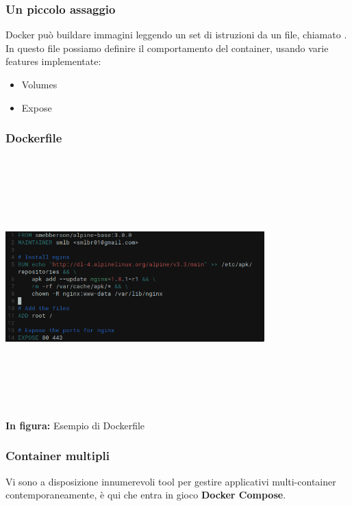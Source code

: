 \documentclass{beamer}
\begin{document}

\begin{frame}
    \frametitle{Un piccolo assaggio}
    Docker pu\`o buildare immagini leggendo un set di istruzioni da un file, chiamato .
    In questo file possiamo definire il comportamento del container, usando varie features implementate:
    \begin{itemize}
        \item<1-> Volumes
        \item<2-> Expose
    \end{itemize}
\end{frame}

\begin{frame}
    \frametitle{Dockerfile}
    \begin{center}
        \includegraphics[width=10cm,height=10cm,keepaspectratio]{dockerfile.png}
        \\ \textbf{In figura:} Esempio di Dockerfile
    \end{center}
\end{frame}


\begin{frame}
    \frametitle{Container multipli}
    Vi sono a disposizione innumerevoli tool per gestire applicativi multi-container contemporaneamente, \`e qui che entra in gioco \textbf{Docker Compose}.
\end{frame}

\end{document}
